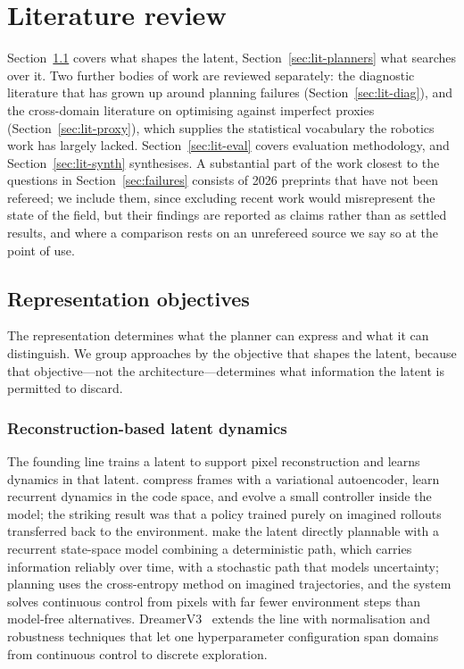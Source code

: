 \documentclass[11pt,letterpaper]{article}
\begin{document}
\section{Literature review}\label{sec:lit}

Section~\ref{sec:lit-repr} covers what shapes the latent,
Section~\ref{sec:lit-planners} what searches over it. Two further bodies of work
are reviewed separately: the diagnostic literature that has grown up around
planning failures (Section~\ref{sec:lit-diag}), and the cross-domain literature
on optimising against imperfect proxies (Section~\ref{sec:lit-proxy}), which
supplies the statistical vocabulary the robotics work has largely lacked.
Section~\ref{sec:lit-eval} covers evaluation methodology, and
Section~\ref{sec:lit-synth} synthesises. A substantial part of the work closest
to the questions in Section~\ref{sec:failures} consists of 2026 preprints that
have not been refereed; we include them, since excluding recent work would
misrepresent the state of the field, but their findings are reported as claims
rather than as settled results, and where a comparison rests on an unrefereed
source we say so at the point of use.

\subsection{Representation objectives}\label{sec:lit-repr}

The representation determines what the planner can express and what it can
distinguish. We group approaches by the objective that shapes the latent,
because that objective---not the architecture---determines what information the
latent is permitted to discard.

\subsubsection{Reconstruction-based latent dynamics}

The founding line trains a latent to support pixel reconstruction and learns
dynamics in that latent. \citet{ha2018worldmodels} compress frames with a
variational autoencoder, learn recurrent dynamics in the code space, and evolve
a small controller inside the model; the striking result was that a policy
trained purely on imagined rollouts transferred back to the environment.
\citet{hafner2019planet} make the latent directly plannable with a recurrent
state-space model combining a deterministic path, which carries information
reliably over time, with a stochastic path that models uncertainty; planning
uses the cross-entropy method on imagined trajectories, and the system solves
continuous control from pixels with far fewer environment steps than model-free
alternatives. DreamerV3~\citep{hafner2025dreamerv3} extends the line with
normalisation and robustness techniques that let one hyperparameter
configuration span domains from continuous control to discrete exploration.
\end{document}
